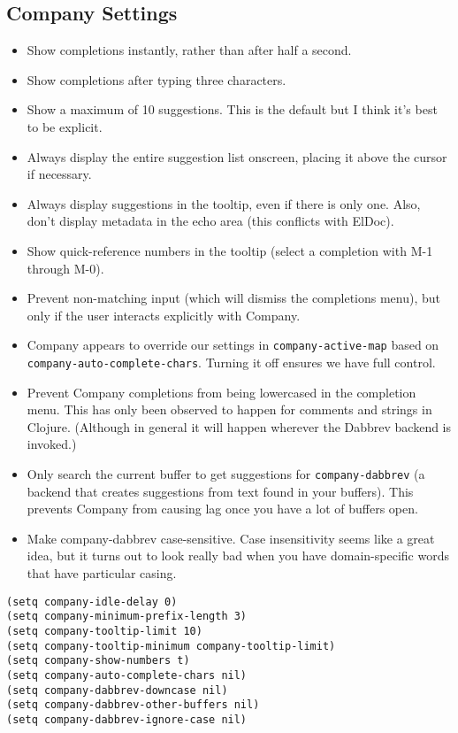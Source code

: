 \documentclass[11pt]{article}
\begin{document}
\subsection{Company Settings}
\label{sec:org6357983}
\begin{itemize}
\item Show completions instantly, rather than after half a second.
\item Show completions after typing three characters.
\item Show a maximum of 10 suggestions. This is the default but I think
it's best to be explicit.
\item Always display the entire suggestion list onscreen, placing it above
the cursor if necessary.
\item Always display suggestions in the tooltip, even if there is only
one. Also, don't display metadata in the echo area (this conflicts
with ElDoc).
\item Show quick-reference numbers in the tooltip (select a completion
with M-1 through M-0).
\item Prevent non-matching input (which will dismiss the completions
menu), but only if the user interacts explicitly with Company.
\item Company appears to override our settings in \texttt{company-active-map}
based on \texttt{company-auto-complete-chars}. Turning it off ensures we
have full control.
\item Prevent Company completions from being lowercased in the
completion menu. This has only been observed to happen for
comments and strings in Clojure. (Although in general it will
happen wherever the Dabbrev backend is invoked.)
\item Only search the current buffer to get suggestions for
\texttt{company-dabbrev} (a backend that creates suggestions from text
found in your buffers). This prevents Company from causing lag
once you have a lot of buffers open.
\item Make company-dabbrev case-sensitive. Case insensitivity seems
like a great idea, but it turns out to look really bad when you
have domain-specific words that have particular casing.
\end{itemize}

\begin{verbatim}
(setq company-idle-delay 0)
(setq company-minimum-prefix-length 3)
(setq company-tooltip-limit 10)
(setq company-tooltip-minimum company-tooltip-limit)
(setq company-show-numbers t)
(setq company-auto-complete-chars nil)
(setq company-dabbrev-downcase nil)
(setq company-dabbrev-other-buffers nil)
(setq company-dabbrev-ignore-case nil)
\end{verbatim}
\end{document}
